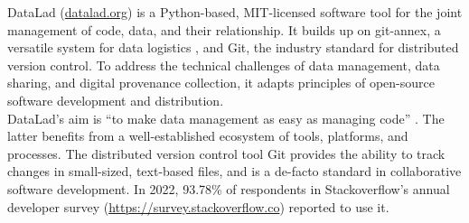 DataLad (\href{http://datalad.org}{datalad.org}) is a Python-based, MIT-licensed software tool for the joint management of code, data, and their relationship.
It builds up on git-annex, a versatile system for data logistics \citep{hessannex}, and Git, the industry standard for distributed version control.
To address the technical challenges of data management, data sharing, and digital provenance collection, it adapts principles of open-source software development and distribution. \\
DataLad's aim is ``to make data management as easy as managing code'' \citep{Halchenko2021}.
The latter benefits from a well-established ecosystem of tools, platforms, and processes.
The distributed version control tool Git provides the ability to track changes in small-sized, text-based files, and is a de-facto standard in collaborative software development. In 2022, 93.78\% of respondents in Stackoverflow's annual developer survey (\url{https://survey.stackoverflow.co}) reported to use it.
